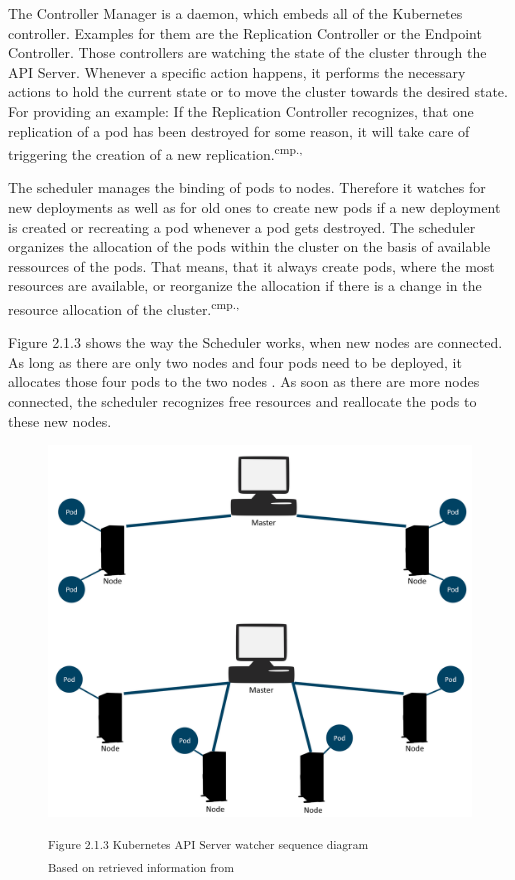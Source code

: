 The Controller Manager is a daemon, which embeds all of the Kubernetes controller. Examples for them are the Replication Controller or the Endpoint Controller. Those controllers are watching the state of the cluster through the API Server. Whenever a specific action happens, it performs the necessary actions to hold the current state or to move the cluster towards the desired state. For providing an example: If the Replication Controller recognizes, that one replication of a pod has been destroyed for some reason, it will take care of triggering the creation of a new replication.\textsuperscript{cmp.\cite{13}, \cite{16}}

The scheduler manages the binding of pods to nodes. Therefore it watches for new deployments as well as for old ones to create new pods if a new deployment is created or recreating a pod whenever a pod gets destroyed. The scheduler organizes the allocation of the pods within the cluster on the basis of available ressources of the pods. That means, that it always create pods, where the most resources are available, or reorganize the allocation if there is a change in the resource allocation of the cluster.\textsuperscript{cmp.\cite{13}, \cite{16}}%

Figure 2.1.3 shows the way the Scheduler works, when new nodes are connected. As long as there are only two nodes and four pods need to be deployed, it allocates those four pods to the two nodes . As soon as there are more nodes connected, the scheduler recognizes free resources and reallocate the pods to these new nodes.

\begin{figure}[h]
\centering
\includegraphics[width=\textwidth/5*3]{images/kubernetes_scheduler.png}

\textsuperscript{Figure 2.1.3 Kubernetes API Server watcher sequence diagram} \\
\textsuperscript{Based on retrieved information from \cite{17}}
\end{figure}

